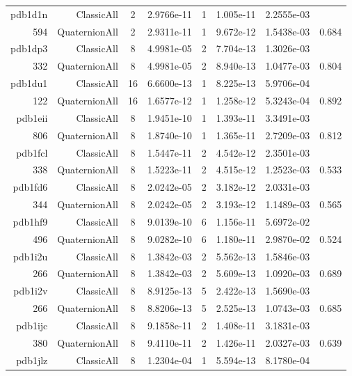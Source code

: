\begin{xltabular}{\textwidth}{r|rcS[table-format=1.4e+2]cS[table-format=1.3e+2]S[table-format=1.4e+2]S[table-format=-1.3]}
pdb1d1n & ClassicAll & 2 & 2.9766e-11 & 1 & 1.005e-11 & 2.2555e-03 & \\
594 & QuaternionAll & 2 & 2.9311e-11 & 1 & 9.672e-12 & 1.5438e-03 & 0.684\\  \addlinespace
pdb1dp3 & ClassicAll & 8 & 4.9981e-05 & 2 & 7.704e-13 & 1.3026e-03 & \\
332 & QuaternionAll & 8 & 4.9981e-05 & 2 & 8.940e-13 & 1.0477e-03 & 0.804\\  \addlinespace
pdb1du1 & ClassicAll & 16 & 6.6600e-13 & 1 & 8.225e-13 & 5.9706e-04 & \\
122 & QuaternionAll & 16 & 1.6577e-12 & 1 & 1.258e-12 & 5.3243e-04 & 0.892\\  \addlinespace
pdb1eii & ClassicAll & 8 & 1.9451e-10 & 1 & 1.393e-11 & 3.3491e-03 & \\
806 & QuaternionAll & 8 & 1.8740e-10 & 1 & 1.365e-11 & 2.7209e-03 & 0.812\\  \addlinespace
pdb1fcl & ClassicAll & 8 & 1.5447e-11 & 2 & 4.542e-12 & 2.3501e-03 & \\
338 & QuaternionAll & 8 & 1.5223e-11 & 2 & 4.515e-12 & 1.2523e-03 & 0.533\\  \addlinespace
pdb1fd6 & ClassicAll & 8 & 2.0242e-05 & 2 & 3.182e-12 & 2.0331e-03 & \\
344 & QuaternionAll & 8 & 2.0242e-05 & 2 & 3.193e-12 & 1.1489e-03 & 0.565\\  \addlinespace
{\color{red} pdb1hf9 } & ClassicAll & 8 & 9.0139e-10 & 6 & 1.156e-11 & 5.6972e-02 & \\
496 & QuaternionAll & 8 & 9.0282e-10 & 6 & 1.180e-11 & 2.9870e-02 & 0.524\\  \addlinespace
pdb1i2u & ClassicAll & 8 & 1.3842e-03 & 2 & 5.562e-13 & 1.5846e-03 & \\
266 & QuaternionAll & 8 & 1.3842e-03 & 2 & 5.609e-13 & 1.0920e-03 & 0.689\\  \addlinespace
pdb1i2v & ClassicAll & 8 & 8.9125e-13 & 5 & 2.422e-13 & 1.5690e-03 & \\
266 & QuaternionAll & 8 & 8.8206e-13 & 5 & 2.525e-13 & 1.0743e-03 & 0.685\\  \addlinespace
pdb1ijc & ClassicAll & 8 & 9.1858e-11 & 2 & 1.408e-11 & 3.1831e-03 & \\
380 & QuaternionAll & 8 & 9.4110e-11 & 2 & 1.426e-11 & 2.0327e-03 & 0.639\\  \addlinespace
pdb1jlz & ClassicAll & 8 & 1.2304e-04 & 1 & 5.594e-13 & 8.1780e-04 & \\

\end{xltabular}
